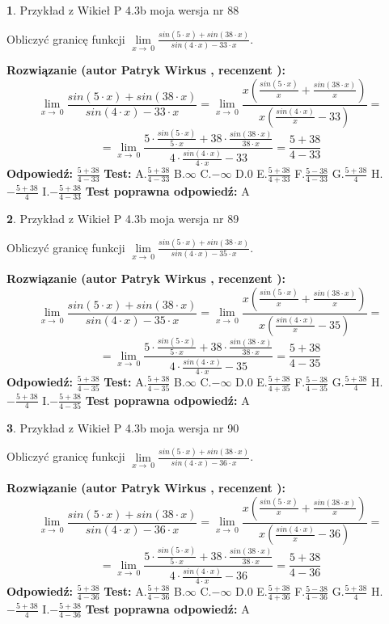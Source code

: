 \documentclass[12pt, a4paper]{article}
\theoremstyle{definition} %
\newtheorem{zad}{}
\newcommand{\zadStart}[1]{\begin{zad}#1\newline}
\newcommand{\zadStop}{\end{zad}}
\newcommand{\rozwStart}[2]{\noindent \textbf{Rozwiązanie (autor #1 , recenzent #2): }\newline}
\newcommand{\rozwStop}{\newline}
\newcommand{\odpStart}{\noindent \textbf{Odpowiedź:}\newline}
\newcommand{\odpStop}{\newline}
\newcommand{\testStart}{\noindent \textbf{Test:}\newline}
\newcommand{\testStop}{\newline}
\newcommand{\kluczStart}{\noindent \textbf{Test poprawna odpowiedź:}\newline}
\newcommand{\kluczStop}{\newline}
\begin{document}
\zadStart{Przykład z Wikieł P 4.3b moja wersja nr 88}


Obliczyć granicę funkcji $\lim\limits_{x\to\ 0}\frac{sin(5 \cdot x)+sin(38 \cdot x)}{sin(4 \cdot x)-33 \cdot x}$.
\zadStop
\rozwStart{Patryk Wirkus}{}
$$\lim\limits_{x\to\ 0}\frac{sin(5 \cdot x)+sin(38 \cdot x)}{sin(4 \cdot x)-33 \cdot x}=\lim\limits_{x\to\ 0}\frac{x(\frac{sin(5 \cdot x)}{x}+\frac{sin(38 \cdot x)}{x})}{x(\frac{sin(4 \cdot x)}{x}-33)}=$$
$$=\lim\limits_{x\to\ 0}\frac{5 \cdot \frac{sin(5 \cdot x)}{5 \cdot x}+38 \cdot \frac{sin(38 \cdot x)}{38 \cdot x}}{4 \cdot \frac{sin(4 \cdot x)}{4 \cdot x}-33}=\frac{5+38}{4-33}$$
\rozwStop
\odpStart
$\frac{5+38}{4-33}$
\odpStop
\testStart
A.$\frac{5+38}{4-33}$
B.$\infty$
C.$-\infty$
D.$0$
E.$\frac{5+38}{4+33}$
F.$\frac{5-38}{4-33}$
G.$\frac{5+38}{4}$
H.$-\frac{5+38}{4}$
I.$-\frac{5+38}{4-33}$
\testStop
\kluczStart
A
\kluczStop



\zadStart{Przykład z Wikieł P 4.3b moja wersja nr 89}


Obliczyć granicę funkcji $\lim\limits_{x\to\ 0}\frac{sin(5 \cdot x)+sin(38 \cdot x)}{sin(4 \cdot x)-35 \cdot x}$.
\zadStop
\rozwStart{Patryk Wirkus}{}
$$\lim\limits_{x\to\ 0}\frac{sin(5 \cdot x)+sin(38 \cdot x)}{sin(4 \cdot x)-35 \cdot x}=\lim\limits_{x\to\ 0}\frac{x(\frac{sin(5 \cdot x)}{x}+\frac{sin(38 \cdot x)}{x})}{x(\frac{sin(4 \cdot x)}{x}-35)}=$$
$$=\lim\limits_{x\to\ 0}\frac{5 \cdot \frac{sin(5 \cdot x)}{5 \cdot x}+38 \cdot \frac{sin(38 \cdot x)}{38 \cdot x}}{4 \cdot \frac{sin(4 \cdot x)}{4 \cdot x}-35}=\frac{5+38}{4-35}$$
\rozwStop
\odpStart
$\frac{5+38}{4-35}$
\odpStop
\testStart
A.$\frac{5+38}{4-35}$
B.$\infty$
C.$-\infty$
D.$0$
E.$\frac{5+38}{4+35}$
F.$\frac{5-38}{4-35}$
G.$\frac{5+38}{4}$
H.$-\frac{5+38}{4}$
I.$-\frac{5+38}{4-35}$
\testStop
\kluczStart
A
\kluczStop



\zadStart{Przykład z Wikieł P 4.3b moja wersja nr 90}


Obliczyć granicę funkcji $\lim\limits_{x\to\ 0}\frac{sin(5 \cdot x)+sin(38 \cdot x)}{sin(4 \cdot x)-36 \cdot x}$.
\zadStop
\rozwStart{Patryk Wirkus}{}
$$\lim\limits_{x\to\ 0}\frac{sin(5 \cdot x)+sin(38 \cdot x)}{sin(4 \cdot x)-36 \cdot x}=\lim\limits_{x\to\ 0}\frac{x(\frac{sin(5 \cdot x)}{x}+\frac{sin(38 \cdot x)}{x})}{x(\frac{sin(4 \cdot x)}{x}-36)}=$$
$$=\lim\limits_{x\to\ 0}\frac{5 \cdot \frac{sin(5 \cdot x)}{5 \cdot x}+38 \cdot \frac{sin(38 \cdot x)}{38 \cdot x}}{4 \cdot \frac{sin(4 \cdot x)}{4 \cdot x}-36}=\frac{5+38}{4-36}$$
\rozwStop
\odpStart
$\frac{5+38}{4-36}$
\odpStop
\testStart
A.$\frac{5+38}{4-36}$
B.$\infty$
C.$-\infty$
D.$0$
E.$\frac{5+38}{4+36}$
F.$\frac{5-38}{4-36}$
G.$\frac{5+38}{4}$
H.$-\frac{5+38}{4}$
I.$-\frac{5+38}{4-36}$
\testStop
\kluczStart
A
\kluczStop
\end{document}
